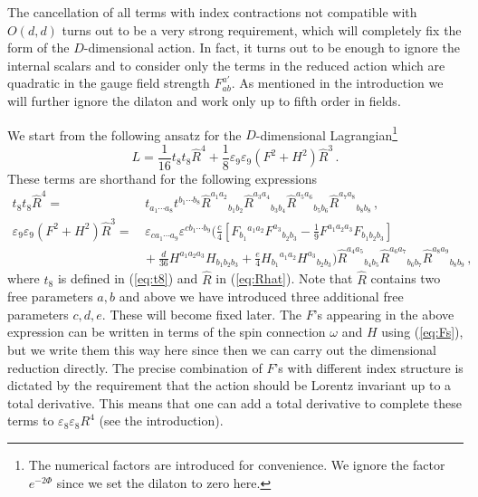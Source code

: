 \documentclass[a4paper,11pt]{article}
\begin{document}
The cancellation of all terms with index contractions not compatible with $O(d,d)$ turns out to be a very strong requirement, which will completely fix the form of the $D$-dimensional action. In fact, it turns out to be enough to ignore the internal scalars and to consider only the terms in the reduced action which are quadratic in the gauge field strength $F^{a'}_{ab}$. As mentioned in the introduction we will further ignore the dilaton and work only up to fifth order in fields.

We start from the following ansatz for the $D$-dimensional Lagrangian\footnote{The numerical factors are introduced for convenience. We ignore the factor $e^{-2\Phi}$ since we set the dilaton to zero here.}
\begin{equation}
L=\frac{1}{16}t_8t_8\hat R^4+\frac18\varepsilon_9\varepsilon_9(F^2+H^2)\hat R^3\,.
\end{equation}
These terms are shorthand for the following expressions
\begin{align}
t_8t_8\hat R^4
=&\,
t_{a_1\cdots a_8}t^{b_1\cdots b_8}\hat R^{a_1a_2}{}_{b_1b_2}\hat R^{a_3a_4}{}_{b_3b_4}\hat R^{a_5a_6}{}_{b_5b_6}\hat R^{a_7a_8}{}_{b_8b_8}\,,
\\
\varepsilon_9\varepsilon_9(F^2+H^2)\hat R^3
=&\,
\varepsilon_{ca_1\cdots a_9}\varepsilon^{cb_1\cdots b_9}
\Big(
\frac{c}{4}\left[F_{b_1}{}^{a_1a_2}F^{a_3}{}_{b_2b_3}-\frac19F^{a_1a_2a_3}F_{b_1b_2b_3}\right]
\label{eq:F2R3}
\\
&{}
+\frac{d}{36}H^{a_1a_2a_3}H_{b_1b_2b_3}
+\frac{e}{4}H_{b_1}{}^{a_1a_2}H^{a_3}{}_{b_2b_3}
\Big)\hat R^{a_4a_5}{}_{b_4b_5}\hat R^{a_6a_7}{}_{b_6b_7}\hat R^{a_8a_9}{}_{b_8b_9}\,,
\nonumber
\end{align}
where $t_8$ is defined in (\ref{eq:t8}) and $\hat R$ in (\ref{eq:Rhat}). Note that $\hat R$ contains two free parameters $a,b$ and above we have introduced three additional free parameters $c,d,e$. These will become fixed later. The $F$'s appearing in the above expression can be written in terms of the spin connection $\omega$ and $H$ using (\ref{eq:Fs}), but we write them this way here since then we can carry out the dimensional reduction directly. The precise combination of $F$'s with different index structure is dictated by the requirement that the action should be Lorentz invariant up to a total derivative. This means that one can add a total derivative to complete these terms to $\varepsilon_8\varepsilon_8R^4$ (see the introduction).
\end{document}
